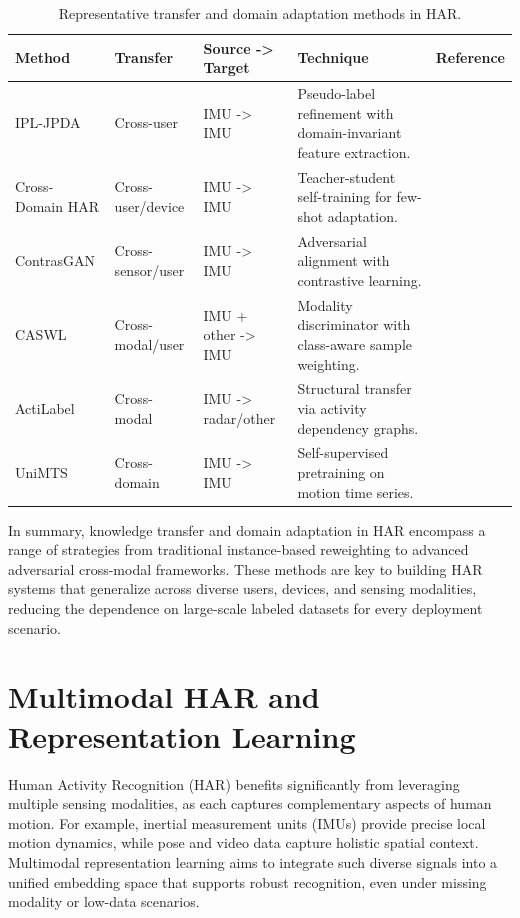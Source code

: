 \begin{table}[t]
  \centering
  \footnotesize
  \caption{Representative transfer and domain adaptation methods in HAR.}
  \label{tab:adaptation-methods}
  \begin{tabular}{l l l p{4.2cm} l}
    \toprule
    \textbf{Method} & \textbf{Transfer} & \textbf{Source -> Target} & \textbf{Technique} & \textbf{Reference} \\
    \midrule
    IPL-JPDA & Cross-user & IMU -> IMU & Pseudo-label refinement with domain-invariant feature extraction. & \cite{fu2021personalized} \\
    Cross-Domain HAR & Cross-user/device & IMU -> IMU & Teacher-student self-training for few-shot adaptation. & \cite{thukral2025cross} \\
    ContrasGAN & Cross-sensor/user & IMU -> IMU & Adversarial alignment with contrastive learning. & \cite{sanabria2021contrasgan} \\
    CASWL & Cross-modal/user & IMU + other -> IMU & Modality discriminator with class-aware sample weighting. & \cite{wu2024class} \\
    ActiLabel & Cross-modal & IMU -> radar/other & Structural transfer via activity dependency graphs. & \cite{alinia2023model} \\
    UniMTS & Cross-domain & IMU -> IMU & Self-supervised pretraining on motion time series. & \cite{zhang2024unimts} \\
    \bottomrule
  \end{tabular}
\end{table}

In summary, knowledge transfer and domain adaptation in HAR encompass a range of strategies from traditional instance-based reweighting to advanced adversarial cross-modal frameworks. These methods are key to building HAR systems that generalize across diverse users, devices, and sensing modalities, reducing the dependence on large-scale labeled datasets for every deployment scenario.

\section{Multimodal HAR and Representation Learning}

Human Activity Recognition (HAR) benefits significantly from leveraging multiple sensing modalities, as each captures complementary aspects of human motion. For example, inertial measurement units (IMUs) provide precise local motion dynamics, while pose and video data capture holistic spatial context. Multimodal representation learning aims to integrate such diverse signals into a unified embedding space that supports robust recognition, even under missing modality or low-data scenarios.

